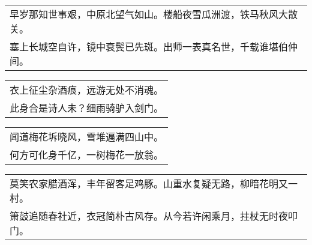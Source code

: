 \nopagebreak%
\nopagebreak%
\noindent\begin{minipage}{\linewidth}
  \vskip-3pt\begin{table}[H]
    \centering
    \begin{tabular}{@{}l@{}}
早岁那知世事艰，中原北望气如山。楼船夜雪瓜洲渡，铁马秋风大散关。\\
塞上长城空自许，镜中衰鬓已先斑。出师一表真名世，千载谁堪伯仲间。
    \end{tabular}
  \end{table}
\end{minipage}
\vspace{1cm}


\nopagebreak%
\nopagebreak%
\noindent\begin{minipage}{\linewidth}
  \vskip-3pt\begin{table}[H]
    \centering
    \begin{tabular}{@{}l@{}}
衣上征尘杂酒痕，远游无处不消魂。\\
此身合是诗人未？细雨骑驴入剑门。
    \end{tabular}
  \end{table}
\end{minipage}
\vspace{1cm}


\nopagebreak%
\nopagebreak%
\noindent\begin{minipage}{\linewidth}
  \vskip-3pt\begin{table}[H]
    \centering
    \begin{tabular}{@{}l@{}}
闻道梅花坼晓风，雪堆遍满四山中。\\
何方可化身千亿，一树梅花一放翁。
    \end{tabular}
  \end{table}
\end{minipage}
\vspace{1cm}


\nopagebreak%
\nopagebreak%
\noindent\begin{minipage}{\linewidth}
  \vskip-3pt\begin{table}[H]
    \centering
    \begin{tabular}{@{}l@{}}
莫笑农家腊酒浑，丰年留客足鸡豚。山重水复疑无路，柳暗花明又一村。\\
箫鼓追随春社近，衣冠简朴古风存。从今若许闲乘月，拄杖无时夜叩门。
    \end{tabular}
  \end{table}
\end{minipage}
\vspace{1cm}


